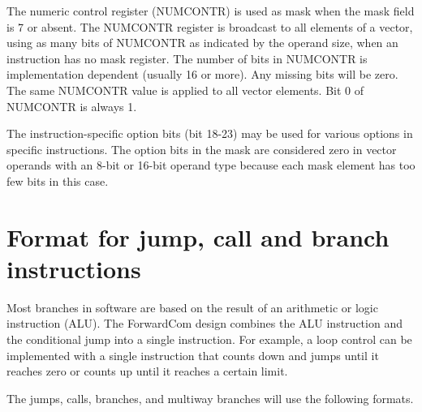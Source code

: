 \documentclass[forwardcom.tex]{subfiles}
\begin{document}
The numeric control register (NUMCONTR) is used as mask when the mask field is 7 or absent. The NUMCONTR register is broadcast to all elements of a vector, using as many bits of NUMCONTR as indicated by the operand size, when an instruction has no mask register. The number of bits in NUMCONTR is implementation dependent (usually 16 or more). Any missing bits will be zero. 
The same NUMCONTR value is applied to all vector elements. 
Bit 0 of NUMCONTR is always 1.
\vv

The instruction-specific option bits (bit 18-23) may be used for various options in specific instructions. The option bits in the mask are considered zero in vector operands with an 8-bit or 16-bit operand type because each mask element has too few bits in this case. 
\vv

\section{Format for jump, call and branch instructions}
Most branches in software are based on the result of an arithmetic or logic instruction (ALU). The ForwardCom design combines the ALU instruction and the conditional jump into a single instruction. For example, a loop control can be implemented with a single instruction that counts down and jumps until it reaches zero or counts up until it reaches a certain limit.
\vv

The jumps, calls, branches, and multiway branches will use the following formats.
\end{document}

